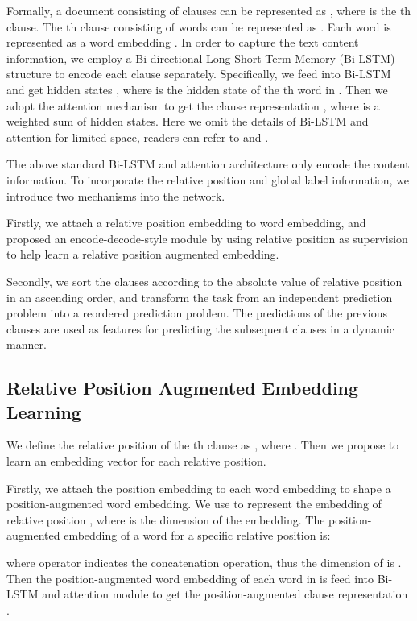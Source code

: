 \documentclass[letterpaper]{article} \usepackage{aaai19}  \usepackage{times}  \usepackage{helvet}  \usepackage{courier}  \usepackage{url}  \usepackage{graphicx}  \frenchspacing  \setlength{\pdfpagewidth}{8.5in}  \setlength{\pdfpageheight}{11in}  \setcounter{secnumdepth}{0}
\begin{document}
Formally, a document consisting of  clauses can be represented as  , where  is the th clause. The th clause consisting of   words can be represented as . Each word  is represented as a word embedding . In order to capture the text content information, we employ a Bi-directional Long Short-Term Memory (Bi-LSTM) structure to encode each clause separately. Specifically, we feed  into Bi-LSTM and get hidden states , where  is the hidden state of the th word in . Then we adopt the attention mechanism to get the clause representation , where  is a weighted sum of hidden states. Here we omit the details of Bi-LSTM and attention for limited space, readers can refer to \cite{graves2013speech} and \cite{bahdanau2014neural}.

The above standard Bi-LSTM and attention architecture only encode the content information. To incorporate the relative position and global label information, we introduce two mechanisms into the network.

Firstly, we attach a relative position embedding to word embedding, and proposed an encode-decode-style module by using relative position as supervision to help learn a relative position augmented embedding.

Secondly, we sort the clauses according to the absolute value of relative position in an ascending order, and transform the task from an independent prediction problem into a reordered prediction problem. The predictions of the previous clauses are used as features for predicting the subsequent clauses in a dynamic manner.




\subsection{Relative Position Augmented Embedding Learning}

We define the relative position of the  th clause as  , where  . Then we propose to learn an embedding vector for each relative position.

Firstly, we attach the position embedding to each word embedding to shape a position-augmented word embedding. We use  to represent the embedding of relative position , where  is the dimension of the embedding. The position-augmented embedding of a word  for a specific relative position  is:

where operator  indicates the concatenation operation, thus the dimension of  is . Then the position-augmented word embedding of each word in  is feed into Bi-LSTM and attention module to get the position-augmented clause representation .
\end{document}
